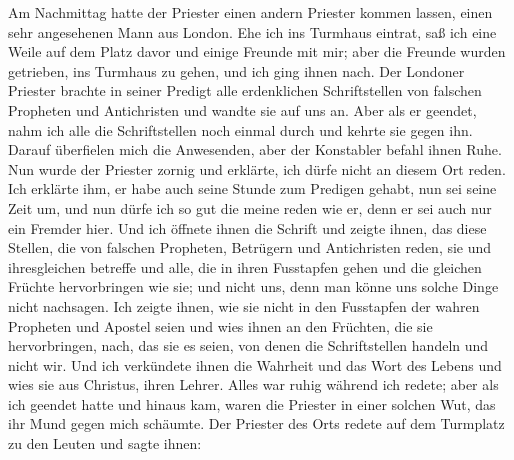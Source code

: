 Am Nachmittag hatte der Priester einen andern Priester
kommen lassen, einen sehr angesehenen Mann aus London. Ehe
ich ins Turmhaus eintrat, saß ich eine Weile auf dem Platz davor
und einige Freunde mit mir; aber die Freunde wurden getrieben, ins
Turmhaus zu gehen, und ich ging ihnen nach. Der Londoner
Priester brachte in seiner Predigt alle erdenklichen Schriftstellen
von falschen Propheten und 
Antichristen und wandte sie auf uns
an. Aber als er geendet, nahm ich alle die Schriftstellen noch
einmal durch und kehrte sie gegen ihn. Darauf überfielen mich
die Anwesenden, aber der Konstabler befahl ihnen Ruhe. Nun
wurde der Priester zornig und erklärte, ich dürfe nicht an diesem
Ort reden. Ich erklärte ihm, er habe auch seine Stunde zum
Predigen gehabt, nun sei seine Zeit um, und nun dürfe ich so
gut die meine reden wie er, denn er sei auch nur ein Fremder
hier. Und ich öffnete ihnen die Schrift und zeigte ihnen, das
diese Stellen, die von falschen Propheten, Betrügern und 
Antichristen reden, sie und ihresgleichen betreffe und alle, 
die in ihren
Fusstapfen gehen und die gleichen Früchte hervorbringen wie sie;
und nicht uns, denn man könne uns solche Dinge nicht 
nachsagen. Ich zeigte ihnen, wie sie nicht in den Fusstapfen der
wahren Propheten und Apostel seien und wies ihnen an den
Früchten, die sie hervorbringen, nach, das sie es seien, von denen
die Schriftstellen handeln und nicht wir. Und ich verkündete ihnen
die Wahrheit und das Wort des Lebens und wies sie aus Christus,
ihren Lehrer. Alles war ruhig während ich redete; aber als ich
geendet hatte und hinaus kam, waren die Priester in einer solchen
Wut, das ihr Mund gegen mich schäumte. Der Priester des
Orts redete auf dem Turmplatz zu den Leuten und sagte ihnen:
